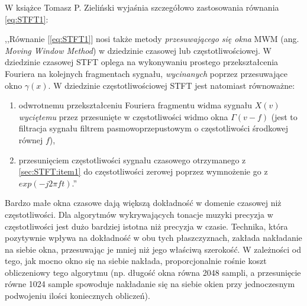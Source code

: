 \documentclass[12pt,a4paper,twoside]{mwart}
\begin{document}
W książce 
\cite[455-458]{CyfrowePrzetwarzanieSygnalowOdTeoriiDoZastosowan}
Tomasz P. Zieliński wyjaśnia szczegółowo zastosowania równania \ref{eq:STFT1}:
\begin{displayquote}
,,Równanie [\ref{eq:STFT1}] nosi także metody \textit{przesuwającego się okna} MWM (ang. \textit{Moving Window Method}) w dziedzinie czasowej lub częstotliwościowej. W dziedzinie czasowej STFT oplega na wykonywaniu prostego przekształcenia Fouriera na kolejnych fragmentach sygnału, \textit{wycinanych} poprzez przesuwające okno $\gamma(x)$. W dziedzinie częstotliwościowej STFT jest natomiast równoważne:
\begin{enumerate}
  \item \label{sec:STFT:item1}odwrotnemu przekształceniu Fouriera fragmentu widma sygnału $X(v)$ \textit{wyciętemu} przez przesunięte w częstotliwości widmo okna $\varGamma (v-f)$ (jest to filtracja sygnału filtrem pasmowoprzepustowym o częstotliwości środkowej równej $f$),
  \item przesunięciem częstotliwości sygnału czasowego otrzymanego z \ref{sec:STFT:item1} do częstotliwości zerowej poprzez wymnożenie go z $exp(-j2 \pi ft)$.''
\end{enumerate}
\end{displayquote}

Bardzo małe okna czasowe dają większą dokładność w domenie czasowej niż częstotliwości. Dla algorytmów wykrywających tonacje muzyki precyzja w częstotliwości jest dużo bardziej istotna niż precyzja w czasie. Technika, która pozytywnie wpływa na dokładność w obu tych płaszczyznach, zakłada nakładanie na siebie okna, przesuwając je mniej niż jego właściwą szerokość. W zależności od tego, jak mocno okno się na siebie nakłada, proporcjonalnie rośnie koszt obliczeniowy tego algorytmu (np. długość okna równa 2048 sampli, a przesunięcie równe 1024 sample spowoduje nakładanie się na siebie okien przy jednoczesnym podwojeniu ilości koniecznych obliczeń). 
\end{document}
